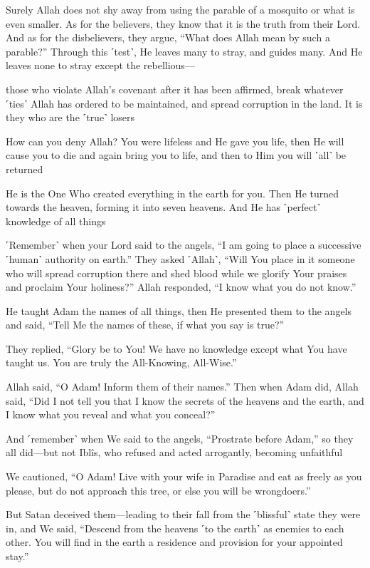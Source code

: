 Surely Allah does not shy away from using the parable of a mosquito or what is even smaller. As for the believers, they know that it is the truth from their Lord. And as for the disbelievers, they argue, “What does Allah mean by such a parable?” Through this ˹test˺, He leaves many to stray, and guides many. And He leaves none to stray except the rebellious—

those who violate Allah’s covenant after it has been affirmed, break whatever ˹ties˺ Allah has ordered to be maintained, and spread corruption in the land. It is they who are the ˹true˺ losers

How can you deny Allah? You were lifeless and He gave you life, then He will cause you to die and again bring you to life, and then to Him you will ˹all˺ be returned

He is the One Who created everything in the earth for you. Then He turned towards the heaven, forming it into seven heavens. And He has ˹perfect˺ knowledge of all things

˹Remember˺ when your Lord said to the angels, “I am going to place a successive ˹human˺ authority on earth.” They asked ˹Allah˺, “Will You place in it someone who will spread corruption there and shed blood while we glorify Your praises and proclaim Your holiness?” Allah responded, “I know what you do not know.”

He taught Adam the names of all things, then He presented them to the angels and said, “Tell Me the names of these, if what you say is true?”

They replied, “Glory be to You! We have no knowledge except what You have taught us. You are truly the All-Knowing, All-Wise.”

Allah said, “O Adam! Inform them of their names.” Then when Adam did, Allah said, “Did I not tell you that I know the secrets of the heavens and the earth, and I know what you reveal and what you conceal?”

And ˹remember˺ when We said to the angels, “Prostrate before Adam,” so they all did—but not Iblîs, who refused and acted arrogantly, becoming unfaithful

We cautioned, “O Adam! Live with your wife in Paradise and eat as freely as you please, but do not approach this tree, or else you will be wrongdoers.”

But Satan deceived them—leading to their fall from the ˹blissful˺ state they were in, and We said, “Descend from the heavens ˹to the earth˺ as enemies to each other. You will find in the earth a residence and provision for your appointed stay.”

